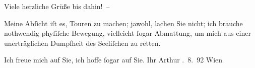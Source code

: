 \pstart
           {\pb}Viele herzliche Grüße bis dahin! –\pend
           
\pstart
           Meine Abſicht iſt es, Touren zu machen; jawohl, lachen Sie nicht; ich brauche
               nothwendig phyſiſche Bewegung, vielleicht{ }ſogar Abmattung, um mich aus einer {\pb}unerträglichen Dumpfheit des Seeliſchen zu retten.\pend
           
\pstart
           Ich freue mich auf Sie, ich hoffe{ }ſogar auf Sie.\pend
           \pstart Ihr \spacefill\mbox{Arthur}\pend{}
. 8. 92{ }Wien\pend
           \endnumbering{}  \newcommand{\dateiname}{L00118}\newcommand{\titel}{Arthur Schnitzler an Richard Beer-Hofmann, 24. 8. 1892}\newcommand{\editorInnen}{Martin Anton Müller und Gerd-Hermann Susen}
